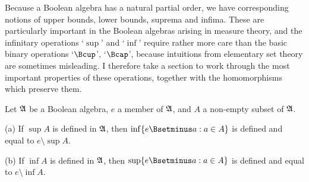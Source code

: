 
\def\chaptername{Boolean algebras}
\def\sectionname{Order-continuous homomorphisms}


Because a Boolean algebra has a natural partial order,
we have corresponding notions of upper bounds, lower bounds, suprema and
infima.   These are particularly important in the Boolean algebras
arising in
measure theory, and the infinitary operations `$\sup$' and `$\inf$'
require rather more care than the basic binary operations `$\Bcup$',
`$\Bcap$', because intuitions from elementary set theory are sometimes
misleading.   I therefore take a section to work through the most
important properties of these operations, together with the
homomorphisms which preserve them.

 Let $\frak A$ be a
Boolean algebra, $e$ a member of $\frak A$, and $A$ a non-empty subset
of $\frak A$.

(a) If $\sup A$ is defined in $\frak A$, then $\inf\{e\Bsetminus a:a\in
A\}$ is defined and equal to $e\setminus\sup A$.

(b) If $\inf A$ is defined in $\frak A$, then $\sup\{e\Bsetminus a:a\in
A\}$ is defined and equal to $e\setminus\inf A$.


